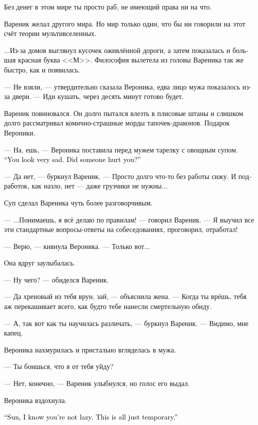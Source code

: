 \documentclass[a5paper,12pt,fleqn]{extbook}\usepackage{cooltooltips}\usepackage{polyglossia}\setdefaultlanguage[babelshorthands=true]{russian}\setotherlanguage{english}\defaultfontfeatures{Ligatures=TeX,Mapping=tex-text} \usepackage{xcolor}\definecolor{lightgray}{HTML}{bbbbbb}\color{lightgray}\newcommand{\ml}[3]{\textenglish{\textcolor{black}{#3}}}
\newcommand{\asterism}{\vspace{1em}{\centering\Large\bfseries$\ast~\ast~\ast$\par}\vspace{1em}}
\begin{document}
Без денег в этом мире ты просто раб, не имеющий права ни на что.

Вареник желал другого мира.
Но мир только один, что бы ни говорили на этот счёт теории мультивселенных.

...Из-за домов выглянул кусочек оживлённой дороги, а затем показалась и большая красная буква <<М>>.
Философия вылетела из головы Вареника так же быстро, как и появилась.

\asterism

--- Не взяли, --- утвердительно сказала Вероника, едва лицо мужа показалось из-за двери.
--- Иди кушать, через десять минут готово будет.

Вареник повиновался.
Он долго пытался влезть в плисовые штаны и слишком долго рассматривал комично-страшные морды тапочек-драконов.
Подарок Вероники.

--- На, ешь, --- Вероника поставила перед мужем тарелку с овощным супом.
\ml{$0$}
{--- Ты очень грустный.}
{``You look very sad.}
\ml{$0$}
{Тебя обидел кто-то?}
{Did someone hurt you?''}

--- Да нет, --- буркнул Вареник.
--- Просто долго что-то без работы сижу.
И подработок, как назло, нет --- даже грузчики не нужны...

Суп сделал Вареника чуть более разговорчивым.

--- ...Понимаешь, я всё делаю по правилам! --- говорил Вареник.
--- Я выучил все эти стандартные вопросы-ответы на собеседованиях, проговорил, отработал!

--- Верю, --- кивнула Вероника.
--- Только вот...

Она вдруг заулыбалась.

--- Ну чего? --- обиделся Вареник.

--- Да хреновый из тебя врун, зай, --- объяснила жена.
--- Когда ты врёшь, тебя аж перекашивает всего, как будто тебе нанесли смертельную обиду.

--- А, так вот как ты научилась различать, --- буркнул Вареник.
--- Видимо, мне капец.

Вероника нахмурилась и пристально вгляделась в мужа.

--- Ты боишься, что я от тебя уйду?

--- Нет, конечно, --- Вареник улыбнулся, но голос его выдал.

Вероника вздохнула.

\ml{$0$}
{--- Солнце, я знаю, что ты не лентяй.}
{``Sun, I know you're not lazy.}
\ml{$0$}
{Это временные трудности.}
{This is all just temporary.''}
\end{document}
